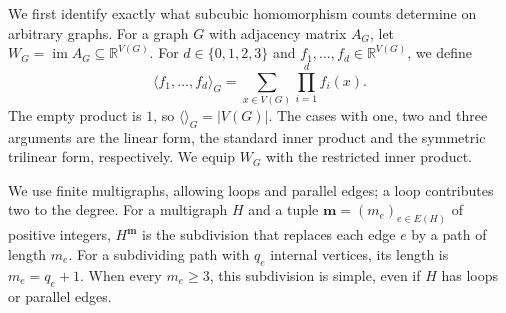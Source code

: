 \documentclass[10pt,a4paper]{article}
\theoremstyle{plain}
\theoremstyle{definition}
\DeclareMathOperator{\im}{im}
\newcommand{\R}{\mathbb{R}}
\begin{document}
We first identify exactly what subcubic homomorphism counts determine
on arbitrary graphs.
For a graph $G$ with adjacency matrix $A_G$, let
$W_G=\im A_G\subseteq\R^{V(G)}$.
For $d\in\{0,1,2,3\}$ and $f_1,\ldots,f_d\in\R^{V(G)}$, we define
\begin{equation}\label{eq:image-trilinear}
 \langle f_1,\ldots,f_d\rangle_G
 =\sum_{x\in V(G)}\prod_{i=1}^{d}f_i(x).
\end{equation}
The empty product is $1$, so $\langle\rangle_G=|V(G)|$.
The cases with one, two and three arguments are the linear form,
the standard inner product and the symmetric trilinear form, respectively.
We equip $W_G$ with the restricted inner product.

We use finite multigraphs, allowing loops and parallel edges; a loop
contributes two to the degree. For a multigraph $H$ and a tuple
$\mathbf m=(m_e)_{e\in E(H)}$ of positive integers, $H^{\mathbf m}$
is the subdivision that replaces each edge $e$ by a path of length $m_e$.
For a subdividing path with $q_e$ internal vertices, its length is $m_e=q_e+1$.
When every $m_e\geq3$, this subdivision is simple, even if $H$ has loops
or parallel edges.
\end{document}
